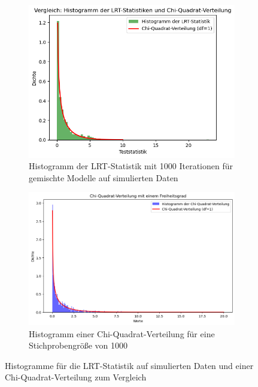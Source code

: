 \documentclass[%
thesis=student,%
coverpage=false,%
titlepage=false,%
headmarks=true, %
german,%
font=libertine, %
math=newpxtx, %
BCOR=5mm,%
coverBCOR=11mm%
]{tumbook}
\theoremstyle{break}
\begin{document}
\begin{figure}[h]
	\centering
	\begin{subfigure}[b]{0.45\textwidth}
		\includegraphics[scale=0.5]{plots/Herzgesundheit_Hist_1000sim_3eff.png}
		\caption{Histogramm der LRT-Statistik mit 1000 Iterationen für gemischte Modelle auf simulierten Daten}
		\label{fig:HIST_MM}
	\end{subfigure}
	\hfill
	\begin{subfigure}[b]{0.5\textwidth}
	\includegraphics[scale=0.4]{plots/Hist_chi_quadrat.png}
	\caption{Histogramm einer Chi-Quadrat-Verteilung für eine Stichprobengröße von 1000}
	\label{fig:HIST_CHISQUARED}
	\end{subfigure}
	\caption{Histogramme für die LRT-Statistik auf simulierten Daten und einer Chi-Quadrat-Verteilung zum Vergleich}
	\label{HIST2}
\end{figure}
\end{document}
